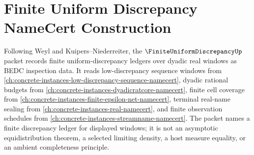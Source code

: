 \chapter{Finite Uniform Discrepancy NameCert Construction}
\label{ch:concrete-instances-finite-uniform-discrepancy-namecert}

Following Weyl and Kuipers--Niederreiter, the $\FiniteUniformDiscrepancyUp$ packet records finite uniform-discrepancy ledgers over dyadic real windows as BEDC inspection data. It reads low-discrepancy sequence windows from \autoref{ch:concrete-instances-low-discrepancy-sequence-namecert}, dyadic rational budgets from \autoref{ch:concrete-instances-dyadicratcore-namecert}, finite cell coverage from \autoref{ch:concrete-instances-finite-epsilon-net-namecert}, terminal real-name sealing from \autoref{ch:concrete-instances-real-namecert}, and finite observation schedules from \autoref{ch:concrete-instances-streamname-namecert}. The packet names a finite discrepancy ledger for displayed windows; it is not an asymptotic equidistribution theorem, a selected limiting density, a host measure equality, or an ambient completeness principle.

